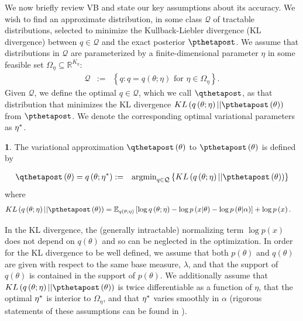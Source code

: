 \documentclass{article}\usepackage[]{graphicx}\usepackage[]{color}
\theoremstyle{plain}
\theoremstyle{definition}
\newtheorem{defn}[thm]{\protect\definitionname}
\theoremstyle{plain}
\theoremstyle{plain}
\theoremstyle{plain}
\theoremstyle{plain}
\providecommand{\definitionname}{Definition}
\begin{document}
We now briefly review VB and state our key assumptions about its accuracy.
We wish to find an approximate distribution, in some class $\mathcal{Q}$
of tractable distributions, selected to minimize the Kullback-Liebler
divergence (KL divergence) between $q\in\mathcal{Q}$ and the exact
posterior $\pthetapost$. We assume that distributions in $\mathcal{Q}$
are parameterized by a finite-dimensional parameter $\eta$ in some
feasible set $\Omega_{\eta}\subseteq\mathbb{R}^{K_{\eta}}$:
\begin{eqnarray}
\mathcal{Q} & := & \left\{ q:q=q\left(\theta;\eta\right)\textrm{ for }\eta\in\Omega_{\eta}\right\} .\label{eq:q_approximating_family}
\end{eqnarray}
Given $\mathcal{Q}$, we define the optimal $q\in\mathcal{Q}$, which
we call $\qthetapost$, as that distribution that minimizes the KL
divergence $KL\left(q\left(\theta;\eta\right)||\pthetapost\left(\theta\right)\right)$
from $\pthetapost$. We denote the corresponding optimal variational
parameters as $\eta^{*}$.
\begin{defn}
The variational approximation $\qthetapost\left(\theta\right)$ to
$\pthetapost\left(\theta\right)$ is defined by

\begin{eqnarray}
\qthetapost\left(\theta\right)=q\left(\theta;\etaopt\right) & := & \textrm{argmin}_{q\in\mathcal{Q}}\left\{ KL\left(q\left(\theta;\eta\right)||\pthetapost\left(\theta\right)\right)\right\} \label{eq:kl_divergence}
\end{eqnarray}
where
\begin{align*}
KL\left(q\left(\theta;\eta\right)||\pthetapost\left(\theta\right)\right) & =\mbe_{q\left(\theta;\eta\right)}\left[\log q\left(\theta;\eta\right)-\log p\left(x\vert\theta\right)-\log p\left(\theta\vert\alpha\right)\right]+\log p\left(x\right).
\end{align*}
\end{defn}

In the KL divergence, the (generally intractable) normalizing term
$\log p\left(x\right)$ does not depend on $q\left(\theta\right)$
and so can be neglected in the optimization. In order for the KL divergence
to be well defined, we assume that both $p\left(\theta\right)$ and
$q\left(\theta\right)$ are given with respect to the same base measure,
$\lambda$, and that the support of $q\left(\theta\right)$ is contained
in the support of $p\left(\theta\right)$. We additionally assume
that $KL\left(q\left(\theta;\eta\right)||\pthetapost\left(\theta\right)\right)$
is twice differentiable as a function of $\eta$, that the optimal
$\eta^{*}$ is interior to $\Omega_{\eta}$, and that $\eta^{*}$ varies
smoothly in $\alpha$ (rigorous statements of these assumptions can
be found in ). 
\end{document}
